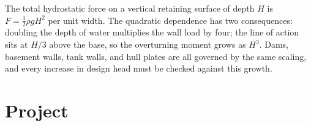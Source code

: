 \begin{principle}
The total hydrostatic force on a vertical retaining surface of
depth $H$ is $F = \tfrac{1}{2}\rho g H^2$ per unit width. The
quadratic dependence has two consequences: doubling the depth of
water multiplies the wall load by four; the line of action sits
at $H/3$ above the base, so the overturning moment grows as $H^3$.
Dams, basement walls, tank walls, and hull plates are all
governed by the same scaling, and every increase in
design head must be checked against this growth.
\end{principle}

\section{Project}

